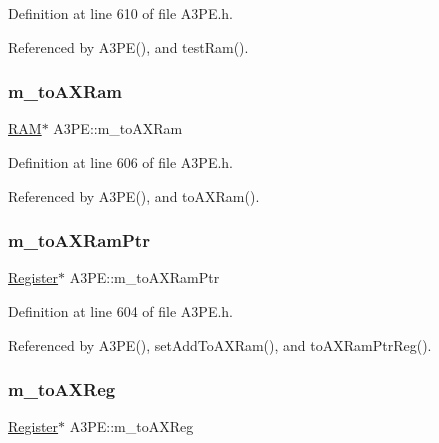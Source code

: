 Definition at line 610 of file A3\+P\+E.\+h.



Referenced by A3\+P\+E(), and test\+Ram().

\mbox{\label{classA3PE_ae586a3d2fd21556e84e1af656e3430b5}} 
\subsubsection{\texorpdfstring{m\+\_\+to\+A\+X\+Ram}{m\_toAXRam}}
{\footnotesize\ttfamily \hyperlink{classRAM}{R\+AM}$\ast$ A3\+P\+E\+::m\+\_\+to\+A\+X\+Ram\hspace{0.3cm}{\ttfamily [private]}}



Definition at line 606 of file A3\+P\+E.\+h.



Referenced by A3\+P\+E(), and to\+A\+X\+Ram().

\mbox{\label{classA3PE_aae1b8b2e96bba94535bd4de766bd7e65}} 
\subsubsection{\texorpdfstring{m\+\_\+to\+A\+X\+Ram\+Ptr}{m\_toAXRamPtr}}
{\footnotesize\ttfamily \hyperlink{classRegister}{Register}$\ast$ A3\+P\+E\+::m\+\_\+to\+A\+X\+Ram\+Ptr\hspace{0.3cm}{\ttfamily [private]}}



Definition at line 604 of file A3\+P\+E.\+h.



Referenced by A3\+P\+E(), set\+Add\+To\+A\+X\+Ram(), and to\+A\+X\+Ram\+Ptr\+Reg().

\mbox{\label{classA3PE_abe8eb76e3c0d967403726143deb1b70f}} 
\subsubsection{\texorpdfstring{m\+\_\+to\+A\+X\+Reg}{m\_toAXReg}}
{\footnotesize\ttfamily \hyperlink{classRegister}{Register}$\ast$ A3\+P\+E\+::m\+\_\+to\+A\+X\+Reg\hspace{0.3cm}{\ttfamily [private]}}



